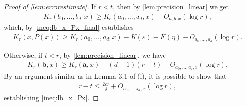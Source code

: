 \documentclass[a4paper,UKenglish,cleveref,autoref,thm-restate]{lipics-v2021}
\begin{document}
\begin{proof}[Proof of \cref{lem:errorestimate}]
	If $r<t$, then by \cref{lem:precision_linear} we get
	\begin{align*}
		K_r(b_0,\dots,b_d,x)\ge K_r(a_0,\dots,a_d,x)-O_{a,b,x}(\log r),
	\end{align*}
	which, by \cref{ineq:lb_x_Px_final} establishes
	\begin{align*}
		K_r(x,P(x))\ge K_r(a_0,\dots,a_d,x)-K(\varepsilon)-K(\eta)-O_{a_0,\dots,a_d}(\log
		r).
	\end{align*}
	
	Otherwise, if $t<r$, by \cref{lem:precision_linear}, we have 
	\begin{align*}
		K_r(\mathbf{b},x)\ge K_r(\mathbf{a},x) - (d+1)(r-t)-O_{a_0,\dots,a_d,x}(\log r).
	\end{align*}
	By an argument similar as in Lemma 3.1 of (i), it is possible to show that  
	\begin{align*}
		r-t\le\frac{2\varepsilon r}{\delta}+O_{a_0,\dots,a_d,x}(\log r),
	\end{align*}
	establishing \cref{ineq:lb_x_Px}. 
\end{proof}

\end{document}
